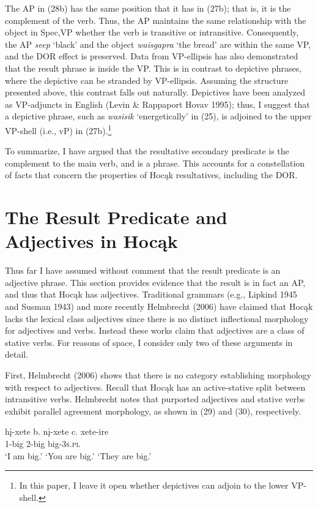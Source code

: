 \documentclass[output=paper]{LSP/langsci}
\begin{document}
The AP in (28b) has the same position that it has in (27b); that is, it is the complement of the verb. Thus, the AP maintains the same relationship with the object in Spec,VP whether the verb is transitive or intransitive. Consequently, the AP \textit{seep} `black' and the object \textit{waisgapra} `the bread' are within the same VP, and the DOR effect is preserved. Data from VP-ellipsis has also demonstrated that the result phrase is inside the VP. This is in contrast to depictive phrases, where the depictive can be stranded by VP-ellipsis. Assuming the structure presented above, this contrast falls out naturally. Depictives have been analyzed as VP-adjuncts in English (Levin \& Rappaport Hovav 1995); thus, I suggest that a depictive phrase, such as \textit{wasisik} `energetically' in (25), is adjoined to the upper VP-shell (i.e., vP) in (27b).\footnote{In this paper, I leave it open whether depictives can adjoin to the lower VP-shell.}

To summarize, I have argued that the resultative secondary predicate is the complement to the main verb, and is a phrase. This accounts for a constellation of facts that concern the properties of Hocąk resultatives, including the DOR.

\section{The Result Predicate and Adjectives in Hocąk} 

Thus far I have assumed without comment that the result predicate is an adjective phrase. This section provides evidence that the result is in fact an AP, and thus that Hocąk has adjectives. Traditional grammars (e.g., Lipkind 1945 and Susman 1943) and more recently Helmbrecht (2006) have claimed that Hocąk lacks the lexical class adjectives since there is no distinct inflectional morphology for adjectives and verbs. Instead these works claim that adjectives are a class of stative verbs. For reasons of space, I consider only two of these arguments in detail.

First, Helmbrecht (2006) shows that there is no category establishing morphology with respect to adjectives. Recall that Hocąk has an active-stative split between intransitive verbs. Helmbrecht notes that purported adjectives and stative verbs exhibit parallel agreement morphology, as shown in (29) and (30), respectively.

\begin{exe}
\ex
\begin{xlist}
\ex \gll
hį-xete \hspace{36pt} b. {}  nį-xete \hspace{48pt} c. {} xete-ire\\
1-big {} {} {} 2-big {} {}  {} big-\textsc{3s.pl}\\
\glt `I am big.' \hspace{1.2cm} `You are big.' \hspace{1.1cm} `They are big.'

\end{xlist}
\end{exe}
\end{document}
